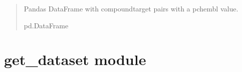 \documentclass[letterpaper,10pt,english]{sphinxmanual}
\begin{document}
\begin{fulllineitems}
\begin{quote}
\begin{description}
\begin{itemize}
\end{itemize}

\sphinxAtStartPar
Pandas DataFrame with compound\sphinxhyphen{}target pairs with a pchembl value.

\sphinxAtStartPar
pd.DataFrame

\end{description}\end{quote}

\end{fulllineitems}


\sphinxstepscope


\section{get\_dataset module}
\label{\detokenize{get_dataset:module-get_dataset}}\label{\detokenize{get_dataset:get-dataset-module}}\label{\detokenize{get_dataset::doc}}
\end{document}
